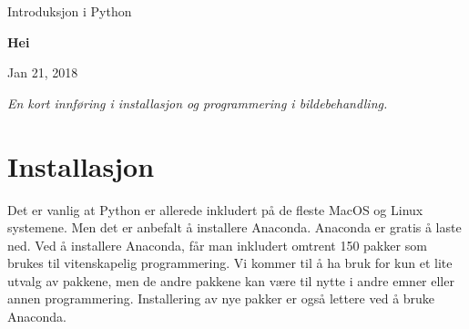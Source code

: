 \documentclass[%
oneside,                 %
final,                   %
10pt]{article}
\begin{document}

\newcommand{\exercisesection}[1]{\subsection*{#1}}






\thispagestyle{empty}

\begin{center}
{\LARGE\bf
\begin{spacing}{1.25}
Introduksjon i Python
\end{spacing}
}
\end{center}


\begin{center}
{\bf Hei${}^{}$} \\ [0mm]
\end{center}

\begin{center}
\end{center}
    

\begin{center}
Jan 21, 2018
\end{center}

\vspace{1cm}


\emph{En kort innføring i installasjon og programmering i bildebehandling.}




\tableofcontents


\vspace{1cm} %




\section{Installasjon}
Det er vanlig at Python er allerede inkludert på de fleste MacOS og Linux systemene.
Men det er anbefalt å installere Anaconda. Anaconda er gratis å laste ned. Ved å installere Anaconda, får man inkludert omtrent 150 pakker som brukes til vitenskapelig programmering. Vi kommer til å ha bruk for kun et lite utvalg av pakkene, men de andre pakkene kan være til nytte i andre emner eller annen programmering.
Installering av nye pakker er også lettere ved å bruke Anaconda.
\end{document}
